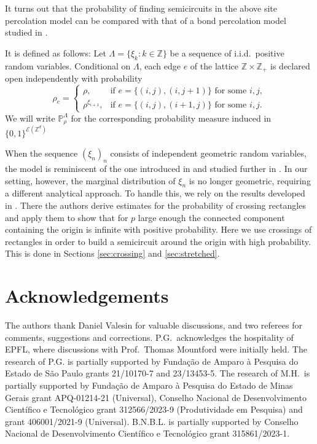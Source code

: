 \documentclass[a4paper,oneside,12pt]{amsart}
\theoremstyle{plain}
\theoremstyle{definition}
\theoremstyle{remark}
\begin{document}
It turns out that the probability of finding semicircuits in the above site percolation model can be compared with that of a bond percolation model studied in \cite{Hilario2023}.

It is defined as follows: Let $\Lambda = \{\xi_k \colon k \in \mathbb{Z}\}$ be a sequence of i.i.d.\ positive random variables. 
Conditional on $\Lambda$, each edge $e$ of the lattice $\mathbb{Z}\times \mathbb{Z}_+$ is declared open independently with probability
\begin{equation}
\label{e:def_perc_stret}
\rho_e = \left\{
\begin{array}{ll}
\rho, & \text{if } e = \{(i, j), (i, j+1)\} \text{ for some } i, j, \\
\rho^{\xi_{i+1}}, & \text{if } e = \{(i, j), (i+1, j)\} \text{ for some } i, j.
\end{array}
\right.
\end{equation}
We will write $\mathbb{P}^{\Lambda}_{\rho}$ for the corresponding probability measure induced in $\{0,1\}^{\mathcal{E}(\mathbb{Z}^d)}$

When the sequence $(\xi_n)_n$ consists of independent geometric random variables, the model is reminiscent of the one introduced in  \cite{JMP} and studied further in \cite{Hoffman_2005, Hilario2023+}.
In our setting, however, the marginal distribution of $\xi_n$ is no longer geometric, requiring a different analytical approach.
To handle this, we rely on the results developed in \cite{Hilario2023}.
There the authors derive estimates for the probability of crossing rectangles and apply them to show that for $p$ large enough the connected component containing the origin is infinite with positive probability. 
Here we use crossings of rectangles in order to build a semicircuit around the origin with high probability.
This is done in Sections \ref{sec:crossing} and \ref{sec:stretched}.

\section*{Acknowledgements} 
The authors thank Daniel Valesin for valuable discussions, and two referees for comments, suggestions and corrections.
P.G.\ acknowledges the hospitality of EPFL, where  discussions with Prof.~Thomas Mountford were initially held. The research of P.G. is partially supported by Fundação de Amparo à Pesquisa do Estado de São Paulo grants	21/10170-7 and 23/13453-5.
The research of M.H.\ is partially supported by Fundação de Amparo à Pesquisa do Estado de Minas Gerais grant APQ-01214-21 (Universal), Conselho Nacional de Desenvolvimento Científico e Tecnológico grant 312566/2023-9 (Produtividade em Pesquisa) and grant 406001/2021-9 (Universal).
B.N.B.L. is partially supported by Conselho Nacional de Desenvolvimento Científico e Tecnológico grant 315861/2023-1.
\end{document}
